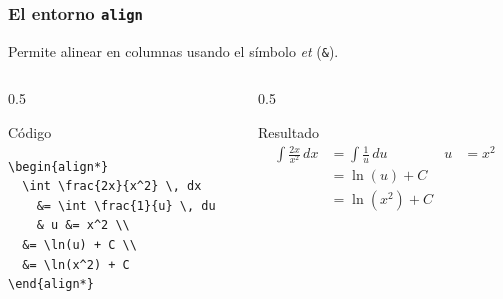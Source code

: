 \documentclass[12pt,aspectratio=169,ignorenonframetext]{ltxbeamer}
\begin{document}
\begin{frame}[fragile]
\frametitle{El entorno \texttt{align}}
Permite alinear en columnas usando el símbolo \emph{et} (\texttt{\&}).

\begin{columns}
    \begin{column}{0.5\textwidth}
        \begin{block}{Código}
\begin{verbatim}
\begin{align*}
  \int \frac{2x}{x^2} \, dx
    &= \int \frac{1}{u} \, du
    & u &= x^2 \\
  &= \ln(u) + C \\
  &= \ln(x^2) + C
\end{align*}
\end{verbatim}
        \end{block}
    \end{column}

    \begin{column}{0.5\textwidth}
        \begin{exampleblock}{Resultado}
            \begin{equation*}
                \begin{aligned}
                    \int \frac{2x}{x^2} \, dx
                      &= \int \frac{1}{u} \, du
                      & u &= x^2 \\
                    &= \ln(u) + C \\
                    &= \ln(x^2) + C
                \end{aligned}
            \end{equation*}
        \end{exampleblock}
    \end{column}
\end{columns}
\end{frame}
\end{document}
